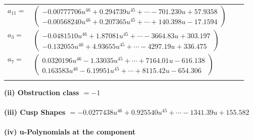 \documentclass[1p]{elsarticle_modified}
\theoremstyle{definition}
\begin{document}
\begin{tabular}{m{7pt} m{180pt} m{7pt} m{180pt} }
\flushright $a_{11}=$&$\begin{pmatrix}-0.00777706 u^{46}+0.294739 u^{45}+\cdots-701.230 u+57.9358\\-0.00568240 u^{46}+0.207365 u^{45}+\cdots+140.398 u-17.1594\end{pmatrix}$ \\
\flushright $a_{3}=$&$\begin{pmatrix}-0.0481510 u^{46}+1.87081 u^{45}+\cdots-3664.83 u+303.197\\-0.132055 u^{46}+4.93655 u^{45}+\cdots-4297.19 u+336.475\end{pmatrix}$ \\
\flushright $a_{7}=$&$\begin{pmatrix}0.0320196 u^{46}-1.33035 u^{45}+\cdots+7164.01 u-616.138\\0.163583 u^{46}-6.19951 u^{45}+\cdots+8115.42 u-654.306\end{pmatrix}$\\&\end{tabular}
\flushleft \textbf{(ii) Obstruction class $= -1$}\\~\\
\flushleft \textbf{(iii) Cusp Shapes $= -0.0277438 u^{46}+0.925540 u^{45}+\cdots-1341.39 u+155.582$}\\~\\
\newpage\renewcommand{\arraystretch}{1}
\flushleft \textbf{(iv) u-Polynomials at the component}\newline \\
\end{document}
